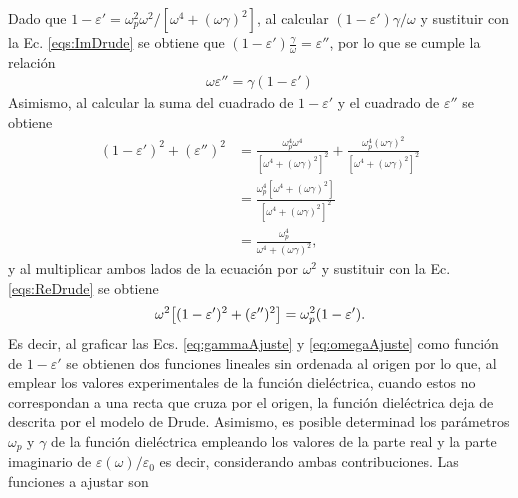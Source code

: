 Dado que $1-\varepsilon' = \omega_p^2\omega^2 / [\omega^4 + (\omega\gamma)^2]$, al calcular  $(1-\varepsilon')\gamma/\omega$ y sustituir con la Ec. \eqref{eqs:ImDrude} se obtiene que $	( 1-\varepsilon') \frac{\gamma}{\omega} =\varepsilon''$, por lo que se cumple la relación
	\begin{align}
	\omega\varepsilon''= \gamma( 1-\varepsilon') \label{eq:gammaAjuste}
	\end{align}
Asimismo, al calcular la suma del cuadrado de $1-\varepsilon'$ y el cuadrado de $\varepsilon''$ se obtiene
	\begin{align*}
	( 1-\varepsilon') ^2 + (\varepsilon'')^2 
					&=\frac{\omega_p^4 \omega^4}{[\omega^4 + (\omega\gamma)^2]^2}+
									\frac{\omega_p^4 (\omega\gamma)^2}{[\omega^4 + (\omega\gamma)^2]^2}\\
					&= \frac{\omega_p^4[\omega^4 + (\omega\gamma)^2]}{[\omega^4 + (\omega\gamma)^2]^2}\\
					&= \frac{\omega_p^4}{\omega^4 + (\omega\gamma)^2},
		\end{align*}
y al multiplicar ambos lados de la ecuación por $\omega^2$	 y sustituir con la Ec. \eqref{eqs:ReDrude} se obtiene
	\begin{align}
	\omega^2\qty[( 1-\varepsilon') ^2 + (\varepsilon'')^2 ]  
						= \omega_p^2( 1-\varepsilon').
	\label{eq:omegaAjuste}
	\end{align}
Es decir, al graficar las Ecs. \eqref{eq:gammaAjuste} y \eqref{eq:omegaAjuste} como función de $ 1-\varepsilon'$ se obtienen dos funciones lineales sin ordenada al origen por lo que, al emplear los valores experimentales de la función dieléctrica, cuando estos no correspondan a una recta que cruza por el origen, la función dieléctrica deja de descrita por el modelo de Drude. Asimismo, es posible determinad los parámetros $\omega_p$ y $\gamma$ de la función dieléctrica empleando los valores de la parte real y la parte imaginario de $\varepsilon(\omega)/\varepsilon_0$ es decir, considerando ambas contribuciones. Las funciones a ajustar son




